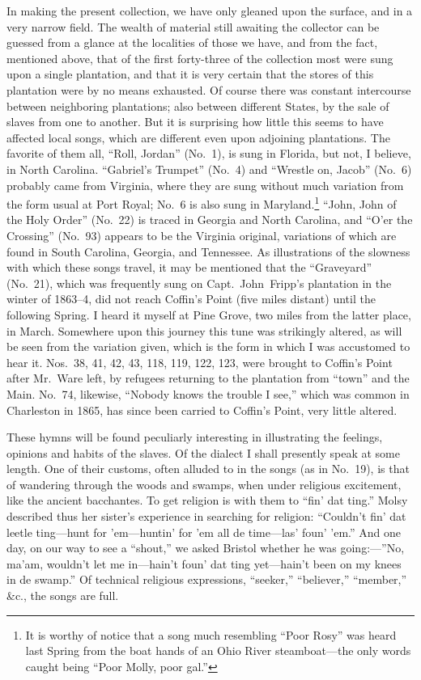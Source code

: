 \documentclass[a5paper,10pt]{book}
\begin{document}
In making the present collection, we have only gleaned upon the
surface, and in a very narrow field.  The wealth of material still
awaiting the collector can be guessed from a glance at the localities
of those we have, and from the fact, mentioned above, that of the
first forty-three of the collection most were sung upon a single
plantation, and that it is very certain that the stores of this
plantation were by no means exhausted.  Of course there was constant
intercourse between neighboring plantations; also between different
States, by the sale of slaves from one to another.  But it is
surprising how little this seems to have affected local songs, which
are different even upon adjoining plantations.  The favorite of them
all, ``Roll, Jordan'' (No.~1), is sung in Florida, but not, I believe,
in North Carolina.  ``Gabriel's Trumpet'' (No.~4) and ``Wrestle on,
Jacob'' (No.~6) probably came from Virginia, where they are sung
without much variation from the form usual at Port Royal; No.~6 is
also sung in Maryland.\footnote{It is worthy of notice that a song
much resembling ``Poor Rosy'' was heard last Spring from the boat
hands of an Ohio River steamboat---the only words caught being ``Poor
Molly, poor gal.''}  ``John, John of the Holy Order'' (No.~22) is
traced in Georgia and North Carolina, and ``O'er the Crossing''
(No.~93) appears to be the Virginia original, variations of which are
found in South Carolina, Georgia, and Tennessee.  As illustrations of
the slowness with which these songs travel, it may be mentioned that
the ``Graveyard'' (No.~21), which was frequently sung on
Capt.~John~Fripp's plantation in the winter of 1863--4, did not reach
Coffin's Point (five miles distant) until the following Spring.  I
heard it myself at Pine Grove, two miles from the latter place, in
March.  Somewhere upon this journey this tune was strikingly altered,
as will be seen from the variation given, which is the form in which I
was accustomed to hear it.  Nos.~38, 41, 42, 43, 118, 119, 122, 123,
were brought to Coffin's Point after Mr.~Ware left, by refugees
returning to the plantation from ``town'' and the Main.  No.~74,
likewise, ``Nobody knows the trouble I see,'' which was common in
Charleston in 1865, has since been carried to Coffin's Point, very
little altered.

These hymns will be found peculiarly interesting in illustrating the
feelings, opinions and habits of the slaves.  Of the dialect I shall
presently speak at some length.  One of their customs, often alluded
to in the songs (as in No.~19), is that of wandering through the woods
and swamps, when under religious excitement, like the ancient
bacchantes.  To get religion is with them to ``fin' dat ting.''  Molsy
described thus her sister's experience in searching for religion:
``Couldn't fin' dat leetle ting---hunt for 'em---huntin' for 'em all
de time---las' foun' 'em.''  And one day, on our way to see a
``shout,'' we asked Bristol whether he was going:---''No, ma'am,
wouldn't let me in---hain't foun' dat ting yet---hain't been on my
knees in de swamp.''  Of technical religious expressions, ``seeker,''
``believer,'' ``member,'' \&c., the songs are full.
\end{document}
